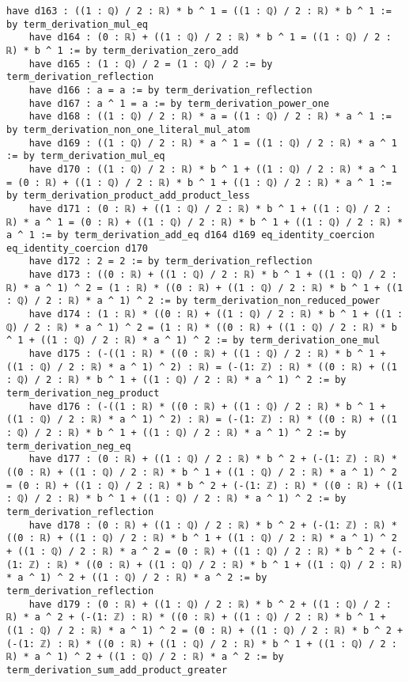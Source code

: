 \documentclass{article}
\begin{document}
\begin{tcolorbox}[colback=white!10, width=\linewidth]
\begin{lstlisting}[language=Lean4]
    have d163 : ((1 : ℚ) / 2 : ℝ) * b ^ 1 = ((1 : ℚ) / 2 : ℝ) * b ^ 1 := by term_derivation_mul_eq
    have d164 : (0 : ℝ) + ((1 : ℚ) / 2 : ℝ) * b ^ 1 = ((1 : ℚ) / 2 : ℝ) * b ^ 1 := by term_derivation_zero_add
    have d165 : (1 : ℚ) / 2 = (1 : ℚ) / 2 := by term_derivation_reflection
    have d166 : a = a := by term_derivation_reflection
    have d167 : a ^ 1 = a := by term_derivation_power_one
    have d168 : ((1 : ℚ) / 2 : ℝ) * a = ((1 : ℚ) / 2 : ℝ) * a ^ 1 := by term_derivation_non_one_literal_mul_atom
    have d169 : ((1 : ℚ) / 2 : ℝ) * a ^ 1 = ((1 : ℚ) / 2 : ℝ) * a ^ 1 := by term_derivation_mul_eq
    have d170 : ((1 : ℚ) / 2 : ℝ) * b ^ 1 + ((1 : ℚ) / 2 : ℝ) * a ^ 1 = (0 : ℝ) + ((1 : ℚ) / 2 : ℝ) * b ^ 1 + ((1 : ℚ) / 2 : ℝ) * a ^ 1 := by term_derivation_product_add_product_less
    have d171 : (0 : ℝ) + ((1 : ℚ) / 2 : ℝ) * b ^ 1 + ((1 : ℚ) / 2 : ℝ) * a ^ 1 = (0 : ℝ) + ((1 : ℚ) / 2 : ℝ) * b ^ 1 + ((1 : ℚ) / 2 : ℝ) * a ^ 1 := by term_derivation_add_eq d164 d169 eq_identity_coercion eq_identity_coercion d170
    have d172 : 2 = 2 := by term_derivation_reflection
    have d173 : ((0 : ℝ) + ((1 : ℚ) / 2 : ℝ) * b ^ 1 + ((1 : ℚ) / 2 : ℝ) * a ^ 1) ^ 2 = (1 : ℝ) * ((0 : ℝ) + ((1 : ℚ) / 2 : ℝ) * b ^ 1 + ((1 : ℚ) / 2 : ℝ) * a ^ 1) ^ 2 := by term_derivation_non_reduced_power
    have d174 : (1 : ℝ) * ((0 : ℝ) + ((1 : ℚ) / 2 : ℝ) * b ^ 1 + ((1 : ℚ) / 2 : ℝ) * a ^ 1) ^ 2 = (1 : ℝ) * ((0 : ℝ) + ((1 : ℚ) / 2 : ℝ) * b ^ 1 + ((1 : ℚ) / 2 : ℝ) * a ^ 1) ^ 2 := by term_derivation_one_mul
    have d175 : (-((1 : ℝ) * ((0 : ℝ) + ((1 : ℚ) / 2 : ℝ) * b ^ 1 + ((1 : ℚ) / 2 : ℝ) * a ^ 1) ^ 2) : ℝ) = (-(1: ℤ) : ℝ) * ((0 : ℝ) + ((1 : ℚ) / 2 : ℝ) * b ^ 1 + ((1 : ℚ) / 2 : ℝ) * a ^ 1) ^ 2 := by term_derivation_neg_product
    have d176 : (-((1 : ℝ) * ((0 : ℝ) + ((1 : ℚ) / 2 : ℝ) * b ^ 1 + ((1 : ℚ) / 2 : ℝ) * a ^ 1) ^ 2) : ℝ) = (-(1: ℤ) : ℝ) * ((0 : ℝ) + ((1 : ℚ) / 2 : ℝ) * b ^ 1 + ((1 : ℚ) / 2 : ℝ) * a ^ 1) ^ 2 := by term_derivation_neg_eq
    have d177 : (0 : ℝ) + ((1 : ℚ) / 2 : ℝ) * b ^ 2 + (-(1: ℤ) : ℝ) * ((0 : ℝ) + ((1 : ℚ) / 2 : ℝ) * b ^ 1 + ((1 : ℚ) / 2 : ℝ) * a ^ 1) ^ 2 = (0 : ℝ) + ((1 : ℚ) / 2 : ℝ) * b ^ 2 + (-(1: ℤ) : ℝ) * ((0 : ℝ) + ((1 : ℚ) / 2 : ℝ) * b ^ 1 + ((1 : ℚ) / 2 : ℝ) * a ^ 1) ^ 2 := by term_derivation_reflection
    have d178 : (0 : ℝ) + ((1 : ℚ) / 2 : ℝ) * b ^ 2 + (-(1: ℤ) : ℝ) * ((0 : ℝ) + ((1 : ℚ) / 2 : ℝ) * b ^ 1 + ((1 : ℚ) / 2 : ℝ) * a ^ 1) ^ 2 + ((1 : ℚ) / 2 : ℝ) * a ^ 2 = (0 : ℝ) + ((1 : ℚ) / 2 : ℝ) * b ^ 2 + (-(1: ℤ) : ℝ) * ((0 : ℝ) + ((1 : ℚ) / 2 : ℝ) * b ^ 1 + ((1 : ℚ) / 2 : ℝ) * a ^ 1) ^ 2 + ((1 : ℚ) / 2 : ℝ) * a ^ 2 := by term_derivation_reflection
    have d179 : (0 : ℝ) + ((1 : ℚ) / 2 : ℝ) * b ^ 2 + ((1 : ℚ) / 2 : ℝ) * a ^ 2 + (-(1: ℤ) : ℝ) * ((0 : ℝ) + ((1 : ℚ) / 2 : ℝ) * b ^ 1 + ((1 : ℚ) / 2 : ℝ) * a ^ 1) ^ 2 = (0 : ℝ) + ((1 : ℚ) / 2 : ℝ) * b ^ 2 + (-(1: ℤ) : ℝ) * ((0 : ℝ) + ((1 : ℚ) / 2 : ℝ) * b ^ 1 + ((1 : ℚ) / 2 : ℝ) * a ^ 1) ^ 2 + ((1 : ℚ) / 2 : ℝ) * a ^ 2 := by term_derivation_sum_add_product_greater

\end{lstlisting}
\end{tcolorbox}
\end{document}
